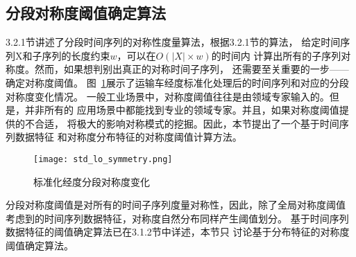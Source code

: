 \subsection{分段对称度阈值确定算法}
3.2.1节讲述了分段时间序列的对称性度量算法，根据3.2.1节的算法，
给定时间序列X和子序列的长度约束$w$，可以在$O(|X| \times w)$的时间内
计算出所有的子序列对称度。然而，如果想判别出真正的对称时间子序列，
还需要至关重要的一步——确定对称度阈值。
图~\ref{fig:lontitude_symmetry}展示了运输车经度标准化处理后的时间序列和对应的分段对称度变化情况。
一般工业场景中，对称度阈值往往是由领域专家输入的。但是，并非所有的
应用场景中都能找到专业的领域专家。并且，如果对称度阈值提供的不合适，
将极大的影响对称模式的挖掘。因此，本节提出了一个基于时间序列数据特征
和对称度分布特征的对称度阈值计算方法。
\begin{figure}
  \centering
  \texttt{[image: std\_lo\_symmetry.png]}
  \caption{标准化经度分段对称度变化}
  \label{fig:lontitude_symmetry}
\end{figure}

分段对称度阈值是对所有的时间子序列度量对称性，因此，除了全局对称度阈值
考虑到的时间序列数据特征，对称度自然分布同样产生阈值划分。
基于时间序列数据特征的阈值确定算法已在3.1.2节中详述，本节只
讨论基于分布特征的对称度阈值确定算法。

